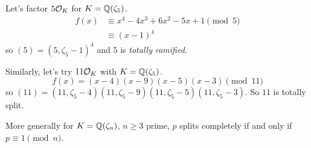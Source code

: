\begin{example}
    Let's factor $5\mathcal{O}_K$ for $K = \mathbb Q(\zeta_5)$.
    \begin{align*}
        f(x) & \equiv x^4 - 4x^3 + 6x^2 - 5x + 1\pmod{5} \\
             & \equiv (x-1)^4
    \end{align*}
    so $(5) = (5, \zeta_5 - 1)^4$ and $5$ is \emph{totally ramified}.
\end{example}
\begin{example}
    Similarly, let's try $11\mathcal{O}_K$ with $K = \mathbb Q(\zeta_5)$.
    \[f(x) = (x - 4)(x - 9)(x - 5)(x - 3)\pmod{11}\]
    so $(11) = (11, \zeta_5 - 4)(11, \zeta_5 - 9)(11, \zeta_5 - 5)(11, \zeta_5 - 3)$. So $11$ is totally split.

    More generally for $K = \mathbb Q(\zeta_n)$, $n\geq 3$ prime, $p$ splits completely if and only if $p\equiv 1\pmod{n}$.
\end{example}

